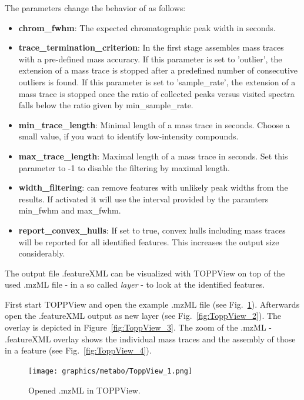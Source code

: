 The parameters change the behavior of  as follows:
\begin{itemize}
\item \textbf{chrom\_fwhm}: The expected chromatographic peak width in seconds.
\item \textbf{trace\_termination\_criterion}: In the first stage  assembles mass traces with a pre-defined mass accuracy. If this parameter is set to 'outlier', the extension of a mass trace is stopped after a predefined number of consecutive outliers is found. If this parameter is set to 'sample\_rate', the extension of a mass trace is stopped once the ratio of collected peaks versus visited spectra falls below the ratio given by min\_sample\_rate.
\item \textbf{min\_trace\_length}: Minimal length of a mass trace in seconds. Choose a small value, if you want to identify low-intensity compounds.
\item \textbf{max\_trace\_length}: Maximal length of a mass trace in seconds. Set this parameter to -1 to disable the filtering by maximal length.
\item \textbf{width\_filtering}:  can remove features with unlikely peak widths from the results. If activated it will use the interval provided by the paramters min\_fwhm and max\_fwhm.
\item \textbf{report\_convex\_hulls}: If set to true, convex hulls including mass traces will be reported for all identified features. This increases the output size considerably.
\end{itemize}

\noindent The output file .featureXML can be visualized with TOPPView on top of the used .mzML file - in a so called 	\textit{layer} - to look at the identified features.
\newline
 
\noindent First start TOPPView and open the example .mzML file (see Fig.~\ref{fig:ToppView_1}). Afterwards open the .featureXML output as new layer (see Fig.~\ref{fig:ToppView_2}). The overlay is depicted in Figure~\ref{fig:ToppView_3}. The zoom of the .mzML - .featureXML overlay shows the individual mass traces and the assembly of those in a feature (see Fig.~\ref{fig:ToppView_4}).

\begin{figure}[htbp]
  \centering
  \texttt{[image: graphics/metabo/ToppView\_1.png]}
  \caption{Opened .mzML in TOPPView.}
  \label{fig:ToppView_1}
\end{figure}

